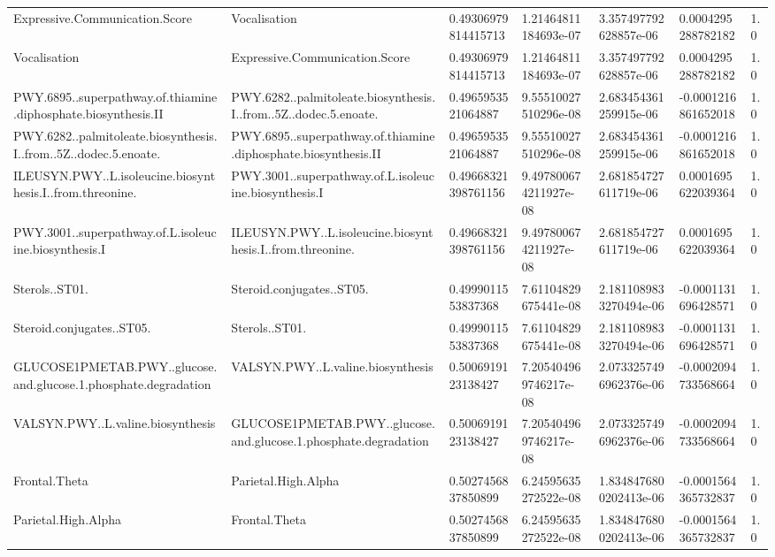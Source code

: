 \begin{longtable}{lllllll}
Expressive.Communication.Score & Vocalisation & 0.49306979814415713 & 1.21464811184693e-07 & 3.357497792628857e-06 & 0.0004295288782182 & 1.0 \\
Vocalisation & Expressive.Communication.Score & 0.49306979814415713 & 1.21464811184693e-07 & 3.357497792628857e-06 & 0.0004295288782182 & 1.0 \\
PWY.6895..superpathway.of.thiamine.diphosphate.biosynthesis.II & PWY.6282..palmitoleate.biosynthesis.I..from..5Z..dodec.5.enoate. & 0.4965953521064887 & 9.55510027510296e-08 & 2.683454361259915e-06 & -0.0001216861652018 & 1.0 \\
PWY.6282..palmitoleate.biosynthesis.I..from..5Z..dodec.5.enoate. & PWY.6895..superpathway.of.thiamine.diphosphate.biosynthesis.II & 0.4965953521064887 & 9.55510027510296e-08 & 2.683454361259915e-06 & -0.0001216861652018 & 1.0 \\
ILEUSYN.PWY..L.isoleucine.biosynthesis.I..from.threonine. & PWY.3001..superpathway.of.L.isoleucine.biosynthesis.I & 0.49668321398761156 & 9.497800674211927e-08 & 2.681854727611719e-06 & 0.0001695622039364 & 1.0 \\
PWY.3001..superpathway.of.L.isoleucine.biosynthesis.I & ILEUSYN.PWY..L.isoleucine.biosynthesis.I..from.threonine. & 0.49668321398761156 & 9.497800674211927e-08 & 2.681854727611719e-06 & 0.0001695622039364 & 1.0 \\
Sterols..ST01. & Steroid.conjugates..ST05. & 0.4999011553837368 & 7.61104829675441e-08 & 2.1811089833270494e-06 & -0.0001131696428571 & 1.0 \\
Steroid.conjugates..ST05. & Sterols..ST01. & 0.4999011553837368 & 7.61104829675441e-08 & 2.1811089833270494e-06 & -0.0001131696428571 & 1.0 \\
GLUCOSE1PMETAB.PWY..glucose.and.glucose.1.phosphate.degradation & VALSYN.PWY..L.valine.biosynthesis & 0.5006919123138427 & 7.205404969746217e-08 & 2.0733257496962376e-06 & -0.0002094733568664 & 1.0 \\
VALSYN.PWY..L.valine.biosynthesis & GLUCOSE1PMETAB.PWY..glucose.and.glucose.1.phosphate.degradation & 0.5006919123138427 & 7.205404969746217e-08 & 2.0733257496962376e-06 & -0.0002094733568664 & 1.0 \\
Frontal.Theta & Parietal.High.Alpha & 0.5027456837850899 & 6.24595635272522e-08 & 1.8348476800202413e-06 & -0.0001564365732837 & 1.0 \\
Parietal.High.Alpha & Frontal.Theta & 0.5027456837850899 & 6.24595635272522e-08 & 1.8348476800202413e-06 & -0.0001564365732837 & 1.0 \\

\end{longtable}
